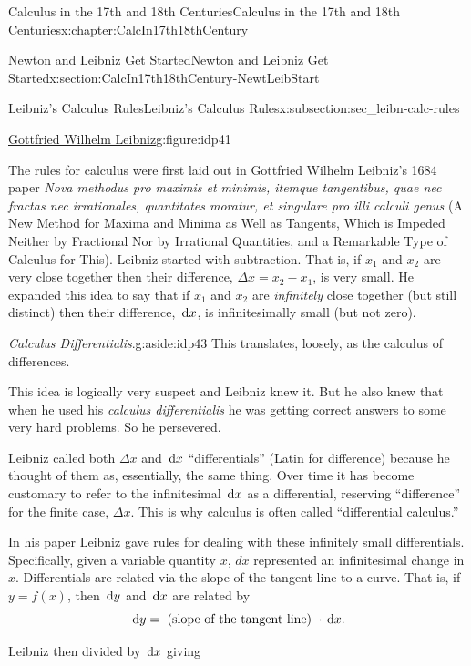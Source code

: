 \begin{chapterptx}{Calculus in the 17th and 18th Centuries}{}{Calculus in the 17th and 18th Centuries}{}{}{x:chapter:CalcIn17th18thCentury}
\begin{sectionptx}{Newton and Leibniz Get Started}{}{Newton and Leibniz Get Started}{}{}{x:section:CalcIn17th18thCentury-NewtLeibStart}
\begin{subsectionptx}{Leibniz's Calculus Rules}{}{Leibniz's Calculus Rules}{}{}{x:subsection:sec_leibn-calc-rules}
\begin{figureptx}{\href{https://mathshistory.st-andrews.ac.uk/Biographies/Leibniz/}{Gottfried Wilhelm Leibniz}\protect\footnotemark{}}{g:figure:idp41}{}
\begin{image}{0.325}{0.35}{0.325}
				\end{image}%
				\tcblower
			\end{figureptx}%
			The rules for calculus were first laid out in Gottfried Wilhelm Leibniz's 1684 paper \textit{Nova methodus pro maximis et minimis, itemque tangentibus, quae nec fractas nec irrationales, quantitates moratur, et singulare pro illi calculi genus} (A New Method for Maxima and Minima as Well as Tangents, Which is Impeded Neither by Fractional Nor by Irrational Quantities, and a Remarkable Type of Calculus for This). Leibniz started with subtraction.  That is, if \(x_1\) and \(x_2\) are very close together then their difference, \(\Delta
			x=x_2-x_1\), is very small.  He expanded this idea to say that if \(x_1\) and \(x_2\) are \emph{infinitely} close together (but still distinct) then their difference, \(\,{\rm d} x\), is infinitesimally small (but not zero).%
			\begin{aside}{\textit{Calculus Differentialis}.}{g:aside:idp43}%
				This translates, loosely, as the calculus of differences.%
			\end{aside}
			This idea is logically very suspect and Leibniz knew it.  But he also knew that when he used his \textit{calculus differentialis} he was getting correct answers to some very hard problems.  So he persevered.%
			\par
			Leibniz called both \(\Delta x\) and \(\,{\rm d} x\) ``differentials'' (Latin for difference) because he thought of them as, essentially, the same thing.  Over time it has become customary to refer to the infinitesimal \(\,{\rm d} x\) as a differential, reserving ``difference'' for the finite case, \(\Delta x\).  This is why calculus is often called ``differential calculus.''%
			\par
			In his paper Leibniz gave rules for dealing with these infinitely small differentials.  Specifically, given a variable quantity \(x\), \(dx\) represented an infinitesimal change in \(x\).  Differentials are related via the slope of the tangent line to a curve.  That is, if \(y=f(x)\), then \(\,{\rm d} y\) and \(\,{\rm d} x\) are related by%
			\begin{equation*}
				\,{\rm d} y=\text{ (slope of the tangent line) } \cdot \,{\rm d} x\text{.}
			\end{equation*}
			\par
			Leibniz then divided by \(\,{\rm d} x\) giving%

\end{subsectionptx}
\end{sectionptx}
\end{chapterptx}
